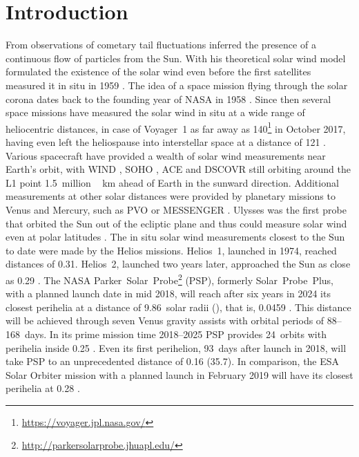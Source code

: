 
\section{Introduction}
From observations of cometary tail fluctuations \citet{Biermann1951} inferred the presence of a continuous flow of particles from the Sun. With his theoretical solar wind model \citet{Parker1958} formulated the existence of the solar wind even before the first satellites measured it in situ in 1959 \citep{Gringauz1960,Neugebauer1966}.
The idea of a space mission flying through the solar corona dates back to the founding year of NASA in 1958 \citep{McComas2008}. Since then several space missions have measured the solar wind in situ at a wide range of heliocentric distances, in case of Voyager~1 as far away as \SI{140}{\au}\footnote{\url{https://voyager.jpl.nasa.gov/}} in October 2017, having even left the heliospause into interstellar space at a distance of \SI{121}{\au} \citep{Gurnett2013}.
Various spacecraft have provided a wealth of solar wind measurements near Earth’s orbit, with WIND \citep{Lepping1995,Ogilvie1995}, SOHO \citep{Domingo1995}, ACE \citep{Stone1998} and DSCOVR \citep{Burt2012} still orbiting around the L1 point \SI{1.5}{million\,\km} ahead of Earth in the sunward direction. Additional measurements at other solar distances were provided by planetary missions to Venus and Mercury, such as PVO \citep{Colin1980} or MESSENGER \citep{Belcher1991}. Ulysses was the first probe that orbited the Sun out of the ecliptic plane and thus could measure solar wind even at polar latitudes \citep{McComas1998}. The in situ solar wind measurements closest to the Sun to date were made by the Helios missions. Helios~1, launched in 1974, reached distances of \SI{0.31}{\au}. Helios~2, launched two years later, approached the Sun as close as \SI{0.29}{\au} \citep{Rosenbauer1977}.
The NASA Parker~Solar~Probe\footnote{\url{http://parkersolarprobe.jhuapl.edu/}} (PSP), formerly Solar~Probe~Plus, with a planned launch date in mid 2018, will reach after six years in 2024 its closest perihelia at a distance of 9.86~solar radii (\Rs), that is, \SI{0.0459}{\au} \citep{Fox2015}. This distance will be achieved through seven Venus gravity assists with orbital periods of 88--168~days. In its prime mission time 2018--2025 PSP provides 24~orbits with perihelia inside \SI{0.25}{\au} \citep{Fox2015}. Even its first perihelion, 93~days after launch in 2018, will take PSP to an unprecedented distance of \SI{0.16}{\au} (\SI{35.7}{\Rs}). In comparison, the ESA Solar Orbiter mission with a planned launch in February 2019 will have its closest perihelia at \SI{0.28}{\au} \citep{Muller2013}.

